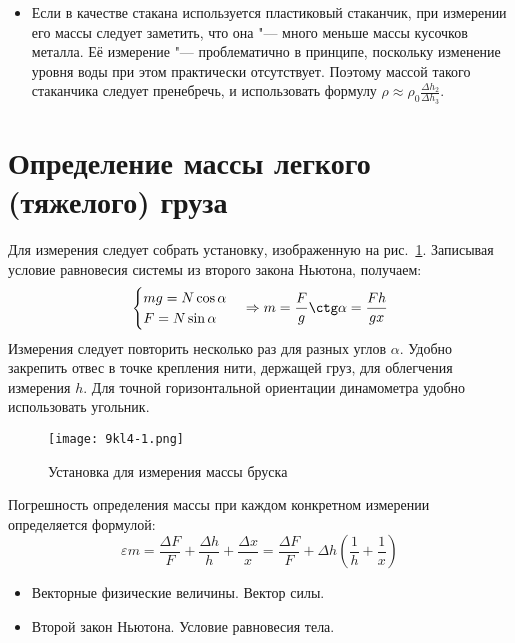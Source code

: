 \AdditionalNotes
\begin{itemize}
  \item Если в качестве стакана используется пластиковый стаканчик, при измерении его массы следует заметить, что она "--- много меньше массы кусочков металла. Её измерение "--- проблематично в принципе, поскольку изменение уровня воды при этом практически отсутствует. Поэтому массой такого стаканчика следует пренебречь, и использовать формулу \(\rho \approx \rho_0 \frac{\Delta h_2}{\Delta h_3}\).
\end{itemize}
\section{Определение массы легкого (тяжелого) груза}
\SolveVariant
Для измерения следует собрать установку, изображенную на рис.~\ref{fig:9kl4:inst}. Записывая условие равновесия системы из второго закона Ньютона, получаем:
\begin{equation*}
    \begin{cases}
    mg=N\cos\alpha\\
    F=N\sin\alpha
    \end{cases}
    \Rightarrow m=\frac{F}{g} \ctg \alpha = \frac{F h}{g x}
\end{equation*}
Измерения следует повторить несколько раз для разных углов \(\alpha\). Удобно закрепить отвес в точке крепления нити, держащей груз, для облегчения измерения \(h\). Для точной горизонтальной ориентации динамометра удобно использовать угольник.
\begin{figure}[h]
    \centering
    \texttt{[image: 9kl4-1.png]}
    \caption{Установка для измерения массы бруска}
    \label{fig:9kl4:inst}
 \end{figure}
\MesErrors
Погрешность определения массы при каждом конкретном измерении определяется формулой:
\begin{equation}
    \varepsilon m = \frac{\Delta F}{F} + \frac{\Delta h}{h} + \frac{\Delta x}{x}= \frac{\Delta F}{F}+\Delta h \left(\frac{1}{h} + \frac{1}{x}\right)
    \label{eq:9kl4:err}
\end{equation}
\SchoolBase
\begin{itemize}
    \item Векторные физические величины. Вектор силы.
    \item Второй закон Ньютона. Условие равновесия тела.
\end{itemize}
